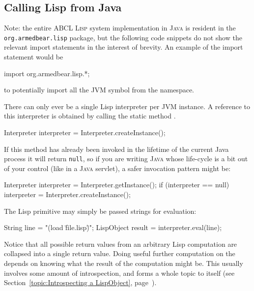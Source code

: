\documentclass[10pt]{book}
\begin{document}
\subsection{Calling Lisp from Java}
\label{sec:calling-lisp-from-java}

Note: the entire \textsc{ABCL} \textsc{Lisp} system implementation in
\textsc{Java} is resident in the \texttt{org.armedbear.lisp} package,
but the following code snippets do not show the relevant import
statements in the interest of brevity.  An example of the import
statement would be
\begin{listing-java}
  import org.armedbear.lisp.*;
\end{listing-java}
to potentially import all the JVM symbol from the 
namespace.

There can only ever be a single Lisp interpreter per \textsc{JVM} instance.  A
reference to this interpreter is obtained by calling the static method
.

\begin{listing-java}
  Interpreter interpreter = Interpreter.createInstance();
\end{listing-java}

If this method has already been invoked in the lifetime of the current
Java process it will return \texttt{null}, so if you are writing \textsc{Java}
whose life-cycle is a bit out of your control (like in a \textsc{Java} servlet),
a safer invocation pattern might be:

\begin{listing-java}
  Interpreter interpreter = Interpreter.getInstance();
  if (interpreter == null) {
    interpreter = Interpreter.createInstance();
  }
\end{listing-java}


The Lisp  primitive may simply be passed strings for evaluation:

\begin{listing-java}
  String line = "(load \"file.lisp\")";
  LispObject result = interpreter.eval(line);
\end{listing-java}

Notice that all possible return values from an arbitrary Lisp
computation are collapsed into a single return value.  Doing useful
further computation on the  depends on knowing what the
result of the computation might be.  This usually involves some amount
of  introspection, and forms a whole topic to itself
(see Section~\ref{topic:Introspecting a LispObject},
page~\pageref{topic:Introspecting a LispObject}).
\end{document}

